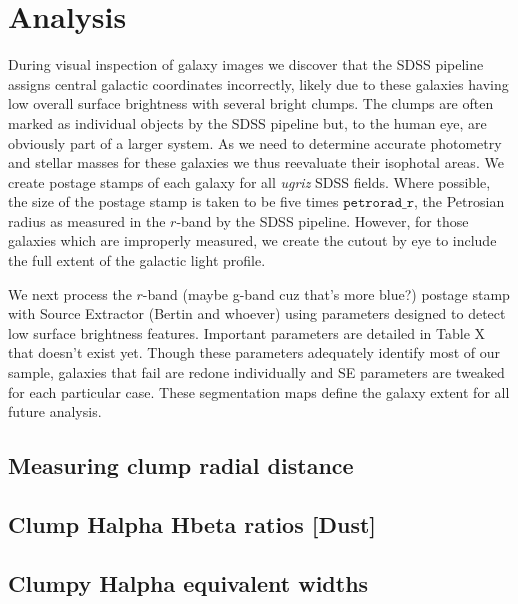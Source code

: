 \section{Analysis}
During visual inspection of galaxy images we discover that the SDSS pipeline assigns central galactic coordinates incorrectly, likely due to these galaxies having low overall surface brightness with several bright clumps. The clumps are often marked as individual objects by the SDSS pipeline but, to the human eye, are obviously part of a larger system. As we need to determine accurate photometry and stellar masses for these galaxies we thus reevaluate their isophotal areas. We create postage stamps of each galaxy for all \textit{ugriz} SDSS fields.  Where possible, the size of the postage stamp is taken to be five times $\mathtt{petrorad\_r}$, the Petrosian radius as measured in the $r$-band by the SDSS pipeline. However, for those galaxies which are improperly measured, we create the cutout by eye to include the full extent of the galactic light profile. 

We next process the $r$-band (maybe g-band cuz that's more blue?) postage stamp with Source Extractor (Bertin and whoever) using parameters designed to detect low surface brightness features. Important parameters are detailed in Table X that doesn't exist yet. Though these parameters adequately identify most of our sample, galaxies that fail are redone individually and SE parameters are tweaked for each particular case. These segmentation maps define the galaxy extent for all future analysis. 



\subsection{Measuring clump radial distance} \label{subsec:radii}


\subsection{Clump Halpha Hbeta ratios [Dust]} \label{subsec:dust}

\subsection{Clumpy Halpha equivalent widths} \label{subsec:ew}





